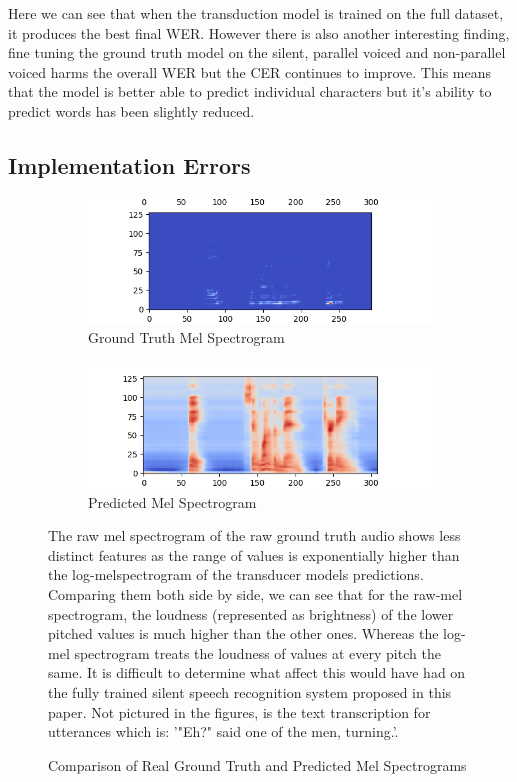 Here we can see that when the transduction model is trained on the full dataset,
it produces the best final WER. However there is also another interesting finding,
fine tuning the ground truth model on the silent, parallel voiced and non-parallel
voiced harms the overall WER but the CER continues to improve. This means that
the model is better able to predict individual characters but it's ability to
predict words has been slightly reduced.

\subsection{Implementation Errors}

\begin{figure}
  \centering
  \begin{subfigure}{.5\textwidth}
    \centering
    \includegraphics[width=1.\linewidth]{graphics/mel_vs_pred/real/458_g.png}
    \caption{Ground Truth Mel Spectrogram}
    \label{fig:sub1}
  \end{subfigure}%
  \begin{subfigure}{.5\textwidth}
    \centering
    \includegraphics[width=1\linewidth]{graphics/mel_vs_pred/real/458_p.png}
    \caption{Predicted Mel Spectrogram}
    \label{fig:sub2}
  \end{subfigure}
  \caption{Comparison of Real Ground Truth and Predicted Mel Spectrograms}
  \label{fig:real-gt-vs-pred-mel}
  The raw mel spectrogram of the raw ground truth audio shows less distinct features
  as the range of values is exponentially higher than the log-melspectrogram of
  the transducer models predictions. Comparing them both side by side, we can see
  that for the raw-mel spectrogram, the loudness (represented as brightness) of the lower
  pitched values is much higher than the other ones. Whereas the log-mel spectrogram
  treats the loudness of values at every pitch the same. It is difficult to determine what
  affect this would have had on the fully trained silent speech recognition system
  proposed in this paper.
  Not pictured in the figures, is
  the text transcription for utterances which is: '"Eh?" said one of the men, turning.'.
\end{figure}

